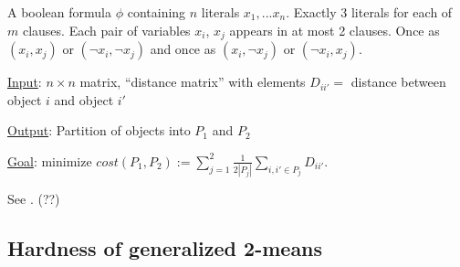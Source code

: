 \begin{definition} 
A boolean formula $\phi$ containing $n$ literals $x_1,...x_n$.
Exactly 3 literals for each of $m$ clauses.  Each pair of variables
$x_i$, $x_j$ appears in at most 2 clauses.  Once as $(x_i,x_j)$ or
$(\neg x_i, \neg x_j)$ and once as  $(x_i,\neg x_j)$ or $(\neg x_i,
x_j)$. 
\end{definition}

\begin{definition}
\item \underline{Input}: $n \times n$ matrix, ``distance matrix'' with
    elements $D_{ii'} =$ distance between object $i$ and object $i'$
\item \underline{Output}: Partition of objects into $P_1$ and $P_2$
\item \underline{Goal}: minimize $cost(P_1,P_2) := \sum\limits_{j=1}^{2}
    \frac{1}{2|P_j|} \sum\limits_{i,i' \in P_j} D_{ii'}$. 
\end{definition}


\begin{lemma} \label{np-nae-3-sat}
See \cite{das2008}. (??)
\end{lemma}

\subsection{Hardness of generalized 2-means}

